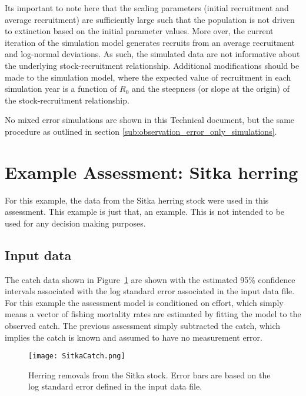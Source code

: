 \documentclass[12pt,letterpaper]{article}
\begin{document}
  Its important to note here that the scaling parameters (initial recruitment and average recruitment) are sufficiently large such that the population is not driven to extinction based on the initial parameter values.  More over, the current iteration of the simulation model generates recruits from an average recruitment and log-normal deviations.  As such, the simulated data are not informative about the underlying stock-recruitment relationship.  Additional modifications should be made to the simulation model, where the expected value of recruitment in each simulation year is a function of $R_0$ and the steepness (or slope at the origin) of the stock-recruitment relationship.

  No mixed error simulations are shown in this Technical document, but the same procedure as outlined in section \ref{sub:observation_error_only_simulations}.






  \section{Example Assessment: Sitka herring} %
  \label{sec:example_assessment_sitka_herring}
  
  For this example, the data from the Sitka herring stock were used in this assessment.  This example is just that, an example. This is not intended to be used for any decision making purposes.


  \subsection{Input data} %
  \label{sub:input_data}
  
  The catch data shown in Figure~\ref{fig:SitkaCatch} are shown with the estimated 95\% confidence intervals associated with the log standard error associated in the input data file.  For this example the assessment model is conditioned on effort, which simply means a vector of fishing mortality rates are estimated by fitting the model to the observed catch.  The previous assessment simply subtracted the catch, which implies the catch is known and assumed to have no measurement error. 



  \begin{figure}[tb]
    \centering
    \texttt{[image: SitkaCatch.png]}
    \caption{Herring removals from the Sitka stock. Error bars are based on the log standard error defined in the input data file.}
    \label{fig:SitkaCatch}
  \end{figure}
\end{document}
